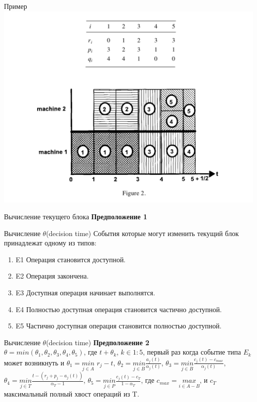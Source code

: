 \documentclass{beamer}
\begin{document}
\begin{frame}{Пример}
    \includegraphics[scale=0.5]{universe}  
\end{frame}


\begin{frame}{Вычисление текущего блока}
    \textbf{Предположение 1} 
      
    
\end{frame}

\begin{frame}{Вычисление $\theta$(decision time)}
      События которые могут изменить текущий блок принадлежат одному из типов:
      \begin{enumerate}
        \item E1 Операция становится доступной.
        \item E2 Операция закончена.
        \item E3 Доступная операция начинает выполнятся.
        \item E4 Полностью доступная операция становится частично доступной.
        \item E5 Частично доступная операция становится полностью доступной.

    \end{enumerate}
\end{frame}

\begin{frame}{Вычисление $\theta$(decision time)}
    \textbf{Предположение 2}\\
      $\theta = min(\theta_1, \theta_2, \theta_3, \theta_4, \theta_5)$, где $t + \theta_k$, $k \in 1:5$, первый раз когда событие типа $E_k$ может возникнуть и
$\theta_1 = {\underset{j \in A}{min}}$ $r_j − t$,
$\theta_2 = {\underset{j \in B}{min}}\frac{a_j(t)}{\alpha_j(t)}$,
$\theta_3 = {\underset{j \in B}{min}}\frac{c_j(t)-c_{max}}{\alpha_j(t)}$,
$\theta_4 = {\underset{j \in T}{min}}\frac{t-(r_j+p_j-a_j(t))}{\alpha_T-1}$,
$\theta_5 = {\underset{j \in P}{min}}\frac{c_j(t)-c_T}{1-\alpha_T}$, где $c_{max} = {\underset{i \in A-B}{max}}$, и $c_T$ максимальный полный хвост операций из T.
    
\end{frame}
\end{document}
